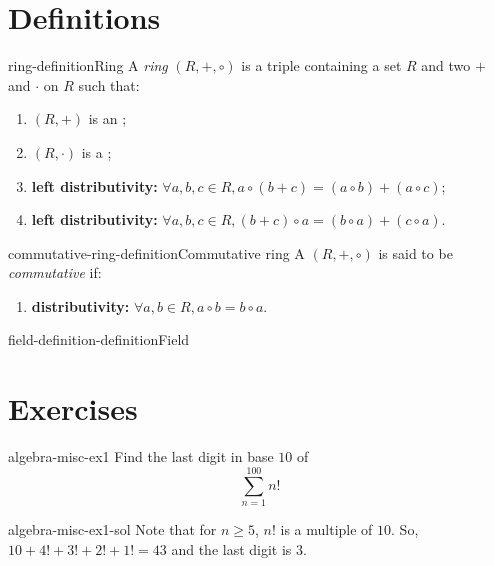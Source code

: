 \documentclass[preview]{standalone}
\begin{document}
\genpage

\section{Definitions}

\begin{snippetdefinition}{ring-definition}{Ring}
    A \textit{ring} \((R, +, \circ)\) is a triple containing a set \(R\) and two 
    \(+\) and \(\cdot\) on \(R\) such that:
    \begin{enumerate}
        \item \((R, +)\) is an \abeliangroup;
        \item \((R, \cdot)\) is a \monoid;
        \item \textbf{left distributivity:} \(\forall a,b,c\in R, a\circ(b+c) = (a\circ b) + (a \circ c)\);
        \item \textbf{left distributivity:} \(\forall a,b,c\in R, (b+c)\circ a = (b\circ a) + (c \circ a)\).
    \end{enumerate}
\end{snippetdefinition}

\begin{snippetdefinition}{commutative-ring-definition}{Commutative ring}
    A \ring \((R, +, \circ)\) is said to be \textit{commutative} if:
    \begin{enumerate}
        \item \textbf{distributivity:} \(\forall a,b\in R, a\circ b = b\circ a\).
    \end{enumerate}
\end{snippetdefinition}

\begin{snippetdefinition}{field-definition-definition}{Field}
    \todo
\end{snippetdefinition}

\section{Exercises}

\begin{snippetexercise}{algebra-misc-ex1}{}
    Find the last digit in base \(10\) of
    \[
        \sum_{n=1}^{100} n!
    \]
\end{snippetexercise}

\begin{snippetsolution}{algebra-misc-ex1-sol}{}
    Note that for \(n\geq 5\), \(n!\) is a multiple of \(10\).
    So, \(10 + 4! + 3! + 2! + 1! = 43\) and the last digit is \(3\).
\end{snippetsolution}
\end{document}
